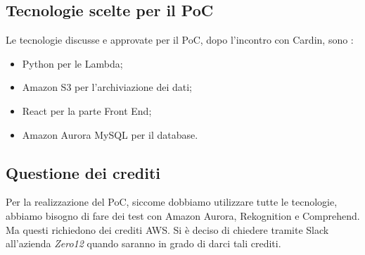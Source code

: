 \subsection{Tecnologie scelte per il PoC}
Le tecnologie discusse e approvate per il PoC, dopo l'incontro con Cardin, sono : 
\begin{itemize}
    \item Python per le Lambda;
    \item Amazon S3 per l'archiviazione dei dati;
    \item React per la parte Front End;
    \item Amazon Aurora MySQL per il database.
\end{itemize}

  

\subsection{Questione dei crediti}
Per la realizzazione del PoC, siccome dobbiamo utilizzare tutte le tecnologie, abbiamo bisogno di fare dei test con Amazon Aurora, Rekognition e Comprehend. Ma questi richiedono dei crediti AWS. Si è deciso di chiedere tramite Slack all'azienda \textit{Zero12} quando saranno in grado di darci tali crediti.



